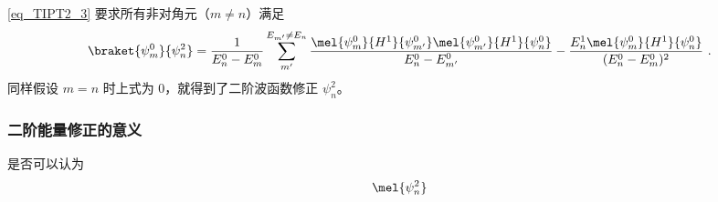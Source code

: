 \autoref{eq_TIPT2_3} 要求所有非对角元（$m\ne n$）满足
\begin{equation} %
\braket{\psi_m^0}{\psi_n^2} =
\frac{1}{E_n^0-E_m^0}\sum_{m'}^{E_{m'}\ne E_n}\frac{\mel{\psi_m^0}{H^1}{\psi_{m'}^0}\mel{\psi_{m'}^0}{H^1}{\psi_n^0}}{E_n^0 - E_{m'}^0} - \frac{E_n^1\mel{\psi_m^0}{H^1}{\psi_n^0}}{(E_n^0 - E_m^0)^2}~.
\end{equation}
同样假设 $m=n$ 时上式为 0，就得到了二阶波函数修正 $\psi_n^2$。

\subsubsection{二阶能量修正的意义}
是否可以认为
\begin{equation}
\mel{\psi_n^2}
\end{equation}
